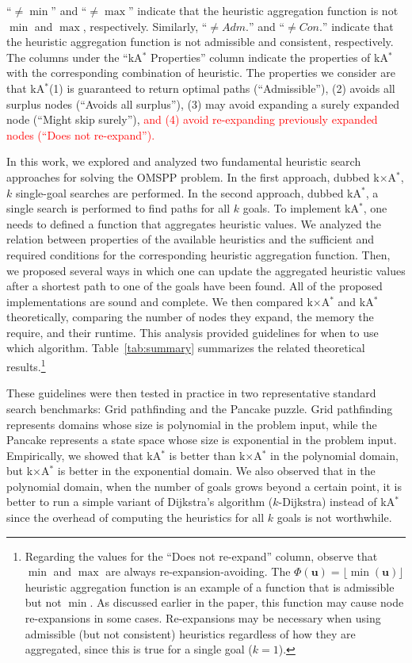\documentclass[smallextended]{svjour3}       %
\newcommand{\kD}{$k$-Dijkstra\xspace}
\newcommand{\omspp}{\ac{OMSPP}\xspace}
\newcommand{\kastar}{kA$^*$\xspace}
\newcommand{\kxastar}{k$\times$A$^*$\xspace}
\newcommand{\axiomadm}{admissible\xspace}
\newcommand{\axiomcons}{consistent\xspace}
\newcommand{\axiomreexpnoun}{re-expansion-avoiding\xspace}
\newcommand{\shortadm}{\mathit{Adm.}}
\newcommand{\shortcon}{\mathit{Con.}}
\newcommand{\vect}[1]{\mathbf{#1}}
\begin{document}
\begin{table}
{``$\neq \min$'' and ``$\neq \max$'' indicate that the heuristic aggregation function is not $\min$ and $\max$, respectively. Similarly, ``$\neq \shortadm$'' and ``$\neq \shortcon$'' indicate that the heuristic aggregation function is not \axiomadm and \axiomcons, respectively. 
The columns under the ``\kastar Properties'' column indicate the properties of \kastar with the corresponding combination of heuristic. The properties we consider are that \kastar (1) is guaranteed to return optimal paths (``Admissible''), (2) avoids all surplus nodes (``Avoids all surplus''), (3) may avoid expanding a surely expanded node (``Might skip surely''), \textcolor{red}{and (4) avoid re-expanding previously expanded nodes (``Does not re-expand'').}}
\label{tab:summary}
\end{table}


In this work, we explored and analyzed two fundamental heuristic search approaches for solving the \omspp problem. 
In the first approach, dubbed \kxastar, $k$ single-goal searches are performed. In the second approach, dubbed \kastar, a single search is performed to find paths for all $k$ goals. 
To implement \kastar, one needs to defined a function that aggregates heuristic values. We analyzed the relation between properties of the available heuristics and the sufficient and required conditions for the corresponding heuristic aggregation function. Then, we proposed several ways in which one can update the aggregated heuristic values after a shortest path to one of the goals have been found. All of the proposed implementations are sound and complete. 
We then compared \kxastar and \kastar theoretically, comparing the number of nodes they expand, the memory the require, and their runtime.
This analysis provided guidelines for when to use which algorithm. 
Table~\ref{tab:summary} summarizes the related theoretical results.\footnote{{\color{red} Regarding the values for the ``Does not re-expand'' column, observe that $\min$ and $\max$ are always \axiomreexpnoun. The $\Phi(\vect{u})=\lfloor \min(\vect{u}) \rfloor$ heuristic aggregation function is an example of a function that is admissible but not $\min$. As discussed earlier in the paper, this function may cause node re-expansions in some cases. Re-expansions may be necessary when using admissible (but not consistent) heuristics regardless of how they are aggregated, since this is true for a single goal ($k=1$).}}

These guidelines were then tested in practice in two representative standard search benchmarks: Grid pathfinding and the Pancake puzzle. Grid pathfinding represents domains whose size is polynomial in the problem input, while the Pancake represents a state space whose size is exponential in the problem input. Empirically, we showed that \kastar is better than \kxastar in the polynomial domain, but \kxastar is better in the exponential domain. 
We also observed that in the polynomial domain, when the number of goals grows beyond a certain point, it is better to run a simple variant of Dijkstra's algorithm (\kD) instead of \kastar since the overhead of computing the heuristics for all $k$ goals is not worthwhile. 
\end{document}
